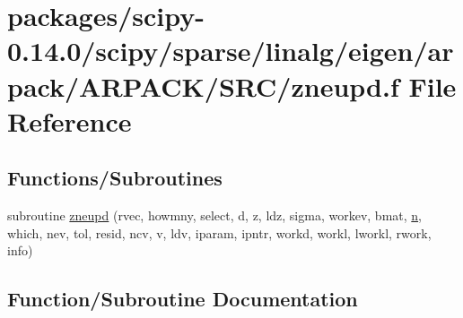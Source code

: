\hypertarget{zneupd_8f}{}\section{packages/scipy-\/0.14.0/scipy/sparse/linalg/eigen/arpack/\+A\+R\+P\+A\+C\+K/\+S\+R\+C/zneupd.f File Reference}
\label{zneupd_8f}
\subsection*{Functions/\+Subroutines}
\begin{DoxyCompactItemize}
\item 
subroutine \hyperlink{zneupd_8f_a0d08ebe20a97f4ba0a9bfee6d7edda2e}{zneupd} (rvec, howmny, select, d, z, ldz, sigma, workev, bmat, \hyperlink{indexexpr_8h_ab427e2e2b4d6cec55fa088ea2a692ace}{n}, which, nev, tol, resid, ncv, v, ldv, iparam, ipntr, workd, workl, lworkl, rwork, info)
\end{DoxyCompactItemize}


\subsection{Function/\+Subroutine Documentation}
\hypertarget{zneupd_8f_a0d08ebe20a97f4ba0a9bfee6d7edda2e}{}
